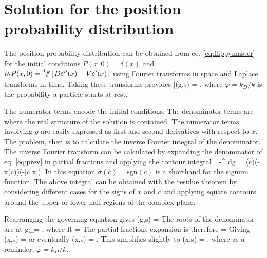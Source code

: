 \section{Solution for the position probability distribution}
\label{sec:fluccymastersol}
The position probability distribution can be obtained from eq. \ref{eq:flippymaster} for the initial conditions $P(x,0) = \delta(x)$ and $ \partial_t P(x,0) = \frac{k_E}{k}\big[D\delta''(x)-V \delta'(x) \big]$ using Fourier transforms in space and Laplace transforms in time. Taking these transforms provides
\be \bar{}(g,s) = ,  \label{eq:prev}\ee
where $\varphi = k_D/k$ is the probability a particle starts at rest.

The numerator terms encode the initial conditions. The denominator terms are where the real structure of the solution is contained.
The numerator terms involving $g$ are easily expressed as first and second derivatives with respect to $x$. The problem, then is to calculate the inverse Fourier integral of the denominator.
The inverse Fourier transform can be calculated by expanding the denominator of eq. \ref{eq:prev} in partial fractions and applying the contour integral \citep[e.g.][]{Arfken1985}
\be \int_{-\infty}^\infty {}  dg = \sigma(c)\theta(-x\sigma(c))\exp\big(-|c x|\big). \label{eq:contour}\ee
In this equation $\sigma(c) = \text{sgn}(c)$ is a shorthand for the signum function. The above integral can be obtained with the residue theorem by considering different cases for the signs of $x$ and $c$ and applying square contours around the upper or lower-half regions of the complex plane.

Rearranging the governing equation gives
\be {}(g,s) = \ee
The roots of the denominator are at
\be g_\pm = \Big[ 1  \pm R \Big],\ee
where
\be R = \ee
The partial fractions expansion is therefore
\be {} = \ee
Giving 
\be {}(x,s) = \ee
or eventually
\be {}(x,s) = .\ee
This simplifies slightly to
\be {}(x,s) = \exp{}, \label{eq:laplaceapp}\ee
where as a reminder, $\varphi = k_D/k$.

